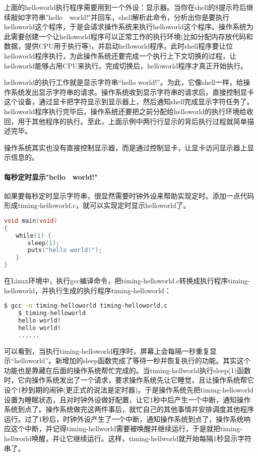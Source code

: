 上面的helloworld执行程序需要用到一个外设：显示器。当你在shell的\$提示符后继续敲如字符串"hello　world!"并回车，shell解析此命令，分析出你是要执行helloworld这个程序，于是会请求操作系统来执行helloworld这个程序。操作系统为此需要创建一个让helloworld程序可以正常工作的执行环境(比如分配内存放代码和数据，提供CPU用于执行等)，并启动helloworld程序。此时shell程序要让位helloworld程序执行，为此操作系统还要完成一个执行上下文切换的过程，让helloworld能够占用CPU来执行。完成切换后，helloworld程序才真正开始执行。

helloworld的执行工作就是显示字符串“hello world!”。为此，它像shell一样，给操作系统发出显示字符串的请求。操作系统收到显示字符串的请求后，直接控制显卡这个设备，通过显卡把字符显示到显示器上，然后通知shell完成显示字符任务了。helloworld程序执行完毕后，操作系统还要把之前分配给helloworld的执行环境给收回，用于其他程序的执行。至此，上面示例中两行行显示的背后执行过程就简单描述完毕。

\begin{note} 
操作系统其实也没有直接控制显示器，而是通过控制显卡，让显卡访问显示器上显示信息的。
\end{note}

\paragraph{每秒定时显示"hello　world!"}
如果要每秒定时显示字符串，很显然需要时钟外设来帮助实现定时。添加一点代码形成timing-helloworld.c，就可以实现定时显示helloworld了。
\begin{lstlisting}[language={C}]
void main(void)
{
　　while(1) {
　　　　sleep(1);
　　　　puts("hello world!");
　　}
}
\end{lstlisting}

在Linux环境中，执行gcc编译命令，把timing-helloworld.c转换成执行程序timing-helloworld，并执行生成的执行程序timing-helloworld：
\begin{lstlisting}[language={bash}]
	$ gcc -o timing-helloworld timing-helloworld.c
	$ timing-helloworld
	hello world!
	hello world!
	......
\end{lstlisting}

可以看到，当执行timing-helloworld程序时，屏幕上会每隔一秒重复显示“helloworld”。新增加的sleep函数完成了等待一秒并恢复执行的功能。其实这个功能也是靠藏在后面的操作系统帮忙完成的。当timing-hellworld执行sleep(1)函数时，它向操作系统发出了一个请求，要求操作系统先让它睡觉，且让操作系统帮它设个1秒到期的闹钟(更正式的说法是定时器)。于是操作系统先把timing-helloworld设置为睡眠状态，且对时钟外设做好配置，让它1秒中后产生一个中断，通知操作系统到点了。操作系统做完这两件事后，就忙自己的其他事情并安排调度其他程序运行。过了1秒后，时钟外设产生了一个中断，通知操作系统到点了，操作系统响应这个中断，并记得timing-hellworld需要被唤醒并继续运行，于是就把timing-hellworld唤醒，并让它继续运行。这样，timing-hellworld就开始每隔1秒显示字符串了。

